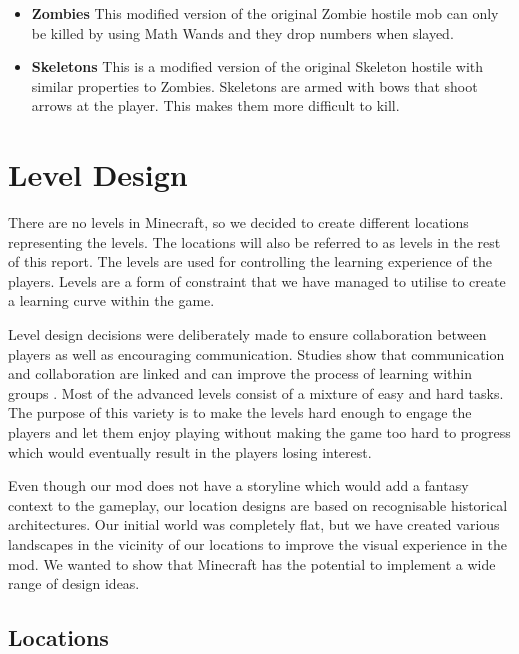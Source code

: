 \begin{itemize}
\item \textbf{Zombies}
\newline
\normalsize This modified version of the original Zombie hostile mob can only be killed by using Math Wands and they drop numbers when slayed.

\item \textbf{Skeletons}
\newline
\normalsize This is a modified version of the original Skeleton hostile with similar properties to Zombies. Skeletons are armed with bows that shoot arrows at the player. This makes them more difficult to kill.
\newline
\end{itemize}

\section{Level Design}
There are no levels in Minecraft, so we decided to create different locations representing the levels. The locations will also be referred to as levels in the rest of this report. The levels are used for controlling the learning experience of the players. Levels are a form of constraint that we have managed to utilise to create a learning curve within the game.

Level design decisions were deliberately made to ensure collaboration between players as well as encouraging communication. Studies show that communication and collaboration are linked and can improve the process of learning within groups \cite{boxtel00}.
Most of the advanced levels consist of a mixture of easy and hard tasks. The purpose of this variety is to make the levels hard enough to engage the players and let them enjoy playing without making the game too hard to progress which would eventually result in the players losing interest.

Even though our mod does not have a storyline which would add a fantasy context to the gameplay, our location designs are based on recognisable historical architectures. Our initial world was completely flat, but we have created various landscapes in the vicinity of our locations to improve the visual experience in the mod. We wanted to show that Minecraft has the potential to implement a wide range of design ideas.

\subsection{Locations}


